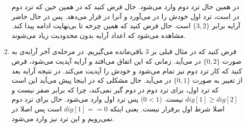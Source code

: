 \begin{enumerate}
    در همین حال ترد دوم وارد
    می‌شود. حال فرض کنید که در همین حین که  ترد دوم در
    است، ترد اول
    خودش را در می‌آورد و آنرا در
    قرار می‌دهد. پس در حال حاضر آرایه برابر
    $\{3, 2\}$
    است. حال فرض کنید که همین چرخه تا بی‌نهایت ادامه پیدا کند. مشاهده می‌شود که اعداد آرایه
    بدون محدودیت زیاد می‌شوند.
    \item فرض کنید که در مثال قبلی بر 3 باقی‌مانده می‌گیریم.
    در مرحله‌ی آخر آرایه‌ی
    به صورت
    $\{0, 2\}$
    در می‌آید. زمانی که این اتفاق می‌افتد و آرایه آپدیت می‌شود، فرض کنید که کار ترد دوم نیز تمام می‌شود و
    خودش را آپدیت می‌کند. در نتیجه آرایه بعد از تغییر به صورت
    $\{0, 1\}$
    در می‌آید.
    حال مشکلی که در اینجا پیش می‌آید این است که ترد اول، برای ترد دوم در
    دوم گیر نمی‌کند، چرا که
    برابر صفر نیست و
    $dig[1] \ge dig[2]$
    نیست.
    ($0 < 1$)
    پس ترد اول وارد
    می‌شود. حال برای ترد دوم اصلا شرط اول برقرار نیست. یعنی اینکه
    $dig[1] == 0$
    است پس اصلا در
    نمی‌رویم و این ترد نیز وارد
    می‌شود.
\end{enumerate}




